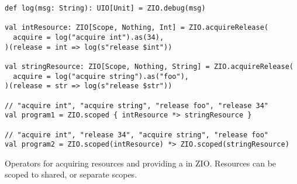 \begin{algorithm}

\begin{verbatim}
def log(msg: String): UIO[Unit] = ZIO.debug(msg)

val intResource: ZIO[Scope, Nothing, Int] = ZIO.acquireRelease(
  acquire = log("acquire int").as(34),
)(release = int => log(s"release $int"))

val stringResource: ZIO[Scope, Nothing, String] = ZIO.acquireRelease(
  acquire = log("acquire string").as("foo"),
)(release = str => log(s"release $str"))

// "acquire int", "acquire string", "release foo", "release 34"
val program1 = ZIO.scoped { intResource *> stringResource }

// "acquire int", "release 34", "acquire string", "release foo"
val program2 = ZIO.scoped(intResource) *> ZIO.scoped(stringResource)
\end{verbatim}

\caption{Operators for acquiring resources and providing a  in ZIO. Resources can be scoped to shared, or separate scopes. \label{zio:scope}}
\end{algorithm}